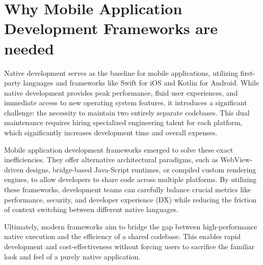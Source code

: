 \chapter{Why Mobile Application Development Frameworks are needed}\label{chap:why_needed}

Native development serves as the baseline for mobile applications, utilizing first-party languages and frameworks like Swift for iOS and Kotlin for Android. While native development provides peak performance, fluid user experiences, and immediate access to new operating system features, it introduces a significant challenge: the necessity to maintain two entirely separate codebases. This dual maintenance requires hiring specialized engineering talent for each platform, which significantly increases development time and overall expenses.

Mobile application development frameworks emerged to solve these exact inefficiencies. They offer alternative architectural paradigms, such as WebView-driven designs, bridge-based Java-Script runtimes, or compiled custom rendering engines, to allow developers to share code across multiple platforms. By utilizing these frameworks, development teams can carefully balance crucial metrics like performance, security, and developer experience (DX) while reducing the friction of context switching between different native languages. 

Ultimately, modern frameworks aim to bridge the gap between high-performance native execution and the efficiency of a shared codebase. This enables rapid development and cost-effectiveness without forcing users to sacrifice the familiar look and feel of a purely native application.